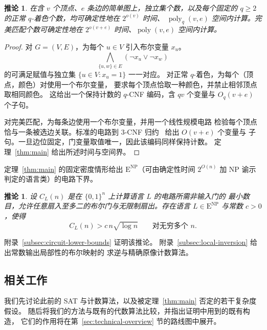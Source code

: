\documentclass[11pt,reqno]{amsart}
\numberwithin{equation}{section}
\newtheorem{corollary}[theorem]{推论}
\theoremstyle{definition}\newtheorem{definition}[theorem]{定义}
\theoremstyle{remark}\newtheorem{remark}[theorem]{注}
\newcommand{\poly}{\operatorname{poly}}
\renewcommand{\ge}{\geqslant}
\begin{document}
\begin{corollary}\label{cor:graph-counting}
在含 $v$ 个顶点、$e$ 条边的简单图上，独立集个数，以及每个固定的
$q\ge2$ 的正常 $q$-着色个数，均可确定性地在 $2^{o(v)}$ 时间、
$\poly_q(v,e)$ 空间内计算。完美匹配个数可确定性地在 $2^{o(v+e)}$
时间、$\poly(v,e)$ 空间内计算。
\end{corollary}
\begin{proof}
对 $G=(V,E)$，为每个 $u\in V$ 引入布尔变量 $x_u$。
\[
 \bigwedge_{\{u,w\}\in E}(\neg x_u\vee\neg x_w)
\]
的可满足赋值与独立集 $\{u\in V:x_u=1\}$ 一一对应。
对正常 $q$-着色，为每个（顶点，颜色）对使用一个布尔变量，
要求每个顶点恰取一种颜色，并禁止相邻顶点取相同颜色。
这给出一个保持计数的 $q$-CNF 编码，含 $qv$ 个变量与
$O_q(v+e)$ 个子句。

对完美匹配，为每条边使用一个布尔变量，并用一个线性规模电路
检验每个顶点恰与一条被选边关联。标准的电路到 $3$-CNF
归约~\cite[Lemmas~15.9--15.10]{Bar23} 给出 $O(v+e)$ 个变量与
子句。一旦边位固定，门变量取值唯一，因此该编码同样保持计数。
定理~\ref{thm:main} 给出所述时间与空间界。
\end{proof}

定理~\ref{thm:main} 的固定密度情形给出
$\mathrm E^{\mathrm{NP}}$（可由确定性时间 $2^{O(n)}$ 加 NP 谕示
判定的语言类）的电路下界。

\begin{corollary}\label{cor:quantitative-circuits}
设 $C_L(n)$ 是在 $\{0,1\}^n$ 上计算语言 $L$ 的电路所需非输入门的
最小数目，允许任意扇入至多二的布尔门与无限制扇出。存在语言
$L\in\mathrm E^{\mathrm{NP}}$ 与常数 $c>0$，使得
\begin{equation}\label{eq:quantitative-circuit-lower-bound}
 C_L(n)>c\,n\sqrt{\log n}\qquad\text{对无穷多个 }n.
\end{equation}
\end{corollary}

附录~\ref{subsec:circuit-lower-bounds} 证明该推论。
附录~\ref{subsec:local-inversion} 给出常数输出局部性的布尔映射的
求逆与精确原像计数算法。

\subsection{相关工作}\label{sec:related}
我们先讨论此前的 SAT 与计数算法，以及被定理~\ref{thm:main}
否定的若干复杂度假设。
随后将我们的方法与既有的代数算法比较，并指出证明中用到的既有构造，
它们的作用将在第~\ref{sec:technical-overview} 节的路线图中展开。
\end{document}
